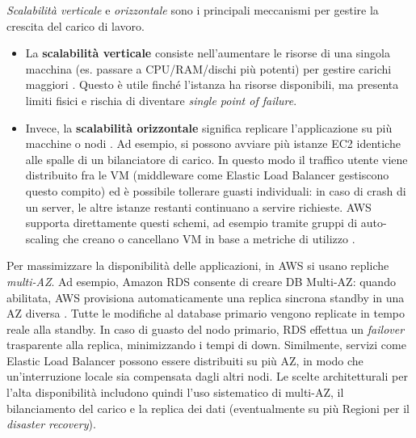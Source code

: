 \textit{Scalabilità verticale} e \textit{orizzontale} sono i principali meccanismi per gestire la crescita del carico di lavoro.
\begin{itemize}
    \item La \textbf{scalabilità verticale} consiste nell’aumentare le risorse di una singola macchina (es. passare a CPU/RAM/dischi più potenti) per gestire carichi maggiori \cite{digitalocean-cloud}. Questo è utile finché l’istanza ha risorse disponibili, ma presenta limiti fisici e rischia di diventare \textit{single point of failure}.
    \item Invece, la \textbf{scalabilità orizzontale} significa replicare l’applicazione su più macchine o nodi \cite{digitalocean-cloud}. Ad esempio, si possono avviare più istanze EC2 identiche alle spalle di un bilanciatore di carico. In questo modo il traffico utente viene distribuito fra le VM (middleware come Elastic Load Balancer gestiscono questo compito) ed è possibile tollerare guasti individuali: in caso di crash di un server, le altre istanze restanti continuano a servire richieste. AWS supporta direttamente questi schemi, ad esempio tramite gruppi di auto-scaling che creano o cancellano VM in base a metriche di utilizzo \cite{aws-scaling}.
\end{itemize}

Per massimizzare la disponibilità delle applicazioni, in AWS si usano repliche \textit{multi-AZ}. Ad esempio, Amazon RDS consente di creare DB Multi-AZ: quando abilitata, AWS provisiona automaticamente una replica sincrona standby in una AZ diversa \cite{aws-rds-multiaz}. Tutte le modifiche al database primario vengono replicate in tempo reale alla standby. In caso di guasto del nodo primario, RDS effettua un \textit{failover} trasparente alla replica, minimizzando i tempi di down. Similmente, servizi come Elastic Load Balancer possono essere distribuiti su più AZ, in modo che un’interruzione locale sia compensata dagli altri nodi. Le scelte architetturali per l’alta disponibilità includono quindi l’uso sistematico di multi-AZ, il bilanciamento del carico e la replica dei dati (eventualmente su più Regioni per il \textit{disaster recovery}).

